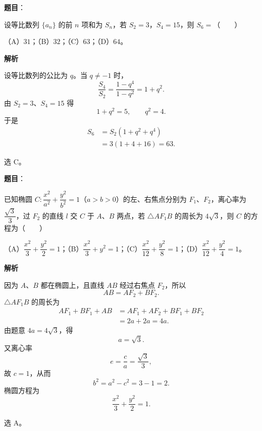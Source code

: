 \begin{answer}

\textbf{题目}：

设等比数列 $\{a_n\}$ 的前 $n$ 项和为 $S_n$，若 $S_2=3$，$S_4=15$，则 $S_6=$\mbox{（　　）}

（A）$31$；（B）$32$；（C）$63$；（D）$64$。

\textbf{解析}

设等比数列的公比为 $q$。当 $q\neq-1$ 时，
\nopagebreak[4]
\[\frac{S_4}{S_2}=\frac{1-q^4}{1-q^2}=1+q^2.\]
由 $S_2=3$、$S_4=15$ 得
\nopagebreak[4]
\[1+q^2=5,\qquad q^2=4.\]
于是
\nopagebreak[4]
\[\begin{aligned}
S_6&=S_2(1+q^2+q^4)\\
&=3(1+4+16)=63.
\end{aligned}\]

选 C。


\end{answer}
\begin{answer}

\textbf{题目}：

已知椭圆 $C:\dfrac{x^2}{a^2}+\dfrac{y^2}{b^2}=1$（$a>b>0$）的左、右焦点分别为 $F_1$、$F_2$，离心率为 $\dfrac{\sqrt3}{3}$，过 $F_2$ 的直线 $l$ 交 $C$ 于 $A$、$B$ 两点，若 $\triangle AF_1B$ 的周长为 $4\sqrt3$，则 $C$ 的方程为\mbox{（　　）}

（A）$\dfrac{x^2}{3}+\dfrac{y^2}{2}=1$；（B）$\dfrac{x^2}{3}+y^2=1$；（C）$\dfrac{x^2}{12}+\dfrac{y^2}{8}=1$；（D）$\dfrac{x^2}{12}+\dfrac{y^2}{4}=1$。

\textbf{解析}

因为 $A$、$B$ 都在椭圆上，且直线 $AB$ 经过右焦点 $F_2$，所以
\nopagebreak[4]
\[AB=AF_2+BF_2.\]
$\triangle AF_1B$ 的周长为
\nopagebreak[4]
\[\begin{aligned}
AF_1+BF_1+AB
&=AF_1+AF_2+BF_1+BF_2\\
&=2a+2a=4a.
\end{aligned}\]
由题意 $4a=4\sqrt3$，得
\nopagebreak[4]
\[a=\sqrt3.\]
又离心率
\nopagebreak[4]
\[e=\frac ca=\frac{\sqrt3}{3},\]
故 $c=1$，从而
\nopagebreak[4]
\[b^2=a^2-c^2=3-1=2.\]
椭圆方程为
\nopagebreak[4]
\[\frac{x^2}{3}+\frac{y^2}{2}=1.\]

选 A。


\end{answer}
